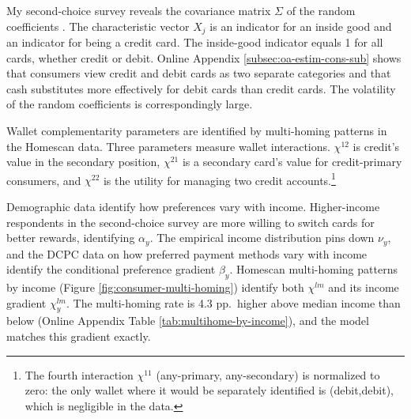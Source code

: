 \documentclass[main.tex]{subfiles}
\begin{document}
My second-choice survey reveals the covariance matrix $\Sigma$ of the random coefficients \parencite{Berry.etal2004}.
The characteristic vector $X_j$ is an indicator for an inside good and an indicator for being a credit card.
The inside-good indicator equals 1 for all cards, whether credit or debit. 
Online Appendix \ref{subsec:oa-estim-cons-sub} shows that consumers view credit and debit cards as two separate categories and that cash substitutes more effectively for debit cards than credit cards.
The volatility of the random coefficients is correspondingly large.

Wallet complementarity parameters are identified by multi-homing patterns in the Homescan data.
Three parameters measure wallet interactions.
$\chi^{12}$ is credit's value in the secondary position, $\chi^{21}$ is a secondary card's value for credit-primary consumers, and $\chi^{22}$ is the utility for managing two credit accounts.\footnote{The fourth interaction $\chi^{11}$ (any-primary, any-secondary) is normalized to zero: the only wallet where it would be separately identified is (debit,debit), which is negligible in the data.}

Demographic data identify how preferences vary with income.
Higher-income respondents in the second-choice survey are more willing to switch cards for better rewards, identifying $\alpha_y$.
The empirical income distribution pins down $\nu_y$, and the DCPC data on how preferred payment methods vary with income identify the conditional preference gradient $\beta_y$.
Homescan multi-homing patterns by income (Figure \ref{fig:consumer-multi-homing}) identify both $\chi^{lm}$ and its income gradient $\chi^{lm}_y$.
The multi-homing rate is 4.3 pp.\ higher above median income than below (Online Appendix Table \ref{tab:multihome-by-income}), and the model matches this gradient exactly.
\end{document}
